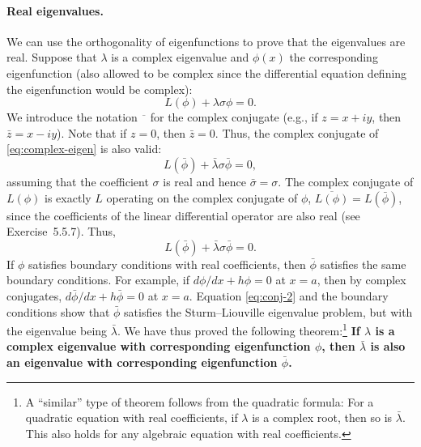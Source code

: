 \paragraph{Real eigenvalues.}
We can use the orthogonality of eigenfunctions to prove that the eigenvalues are real.  Suppose that $\lambda$ is a complex eigenvalue and $\phi(x)$ the corresponding eigenfunction (also allowed to be complex since the differential equation defining the eigenfunction would be complex):
\begin{equation}
\label{eq:complex-eigen}
L(\phi) + \lambda\sigma\phi = 0.
\end{equation}
We introduce the notation $\overline{\phantom{z}}$ for the complex conjugate (e.g., if $z = x + iy$, then $\bar{z} = x - iy$).  Note that if $z = 0$, then $\bar{z} = 0$.  Thus, the complex conjugate of \eqref{eq:complex-eigen} is also valid:
\begin{equation}
\label{eq:conj-1}
L(\bar{\phi}) + \bar{\lambda}\sigma\bar{\phi} = 0,
\end{equation}
assuming that the coefficient $\sigma$ is real and hence $\bar{\sigma} = \sigma$.  The complex conjugate of $L(\phi)$ is exactly $L$ operating on the complex conjugate of $\phi$, $\overline{L(\phi)} = L(\bar{\phi})$, since the coefficients of the linear differential operator are also real (see Exercise~5.5.7).  Thus,
\begin{equation}
\label{eq:conj-2}
L(\bar{\phi}) + \bar{\lambda}\sigma\bar{\phi} = 0.
\end{equation}
If $\phi$ satisfies boundary conditions with real coefficients, then $\bar{\phi}$ satisfies the same boundary conditions.  For example, if $d\phi/dx + h\phi = 0$ at $x = a$, then by complex conjugates, $d\bar{\phi}/dx + h\bar{\phi} = 0$ at $x = a$.  Equation \eqref{eq:conj-2} and the boundary conditions show that $\bar{\phi}$ satisfies the Sturm--Liouville eigenvalue problem, but with the eigenvalue being $\bar{\lambda}$.  We have thus proved the following theorem:\footnote{A ``similar'' type of theorem follows from the quadratic formula: For a quadratic equation with real coefficients, if $\lambda$ is a complex root, then so is $\bar{\lambda}$.  This also holds for any algebraic equation with real coefficients.}  \textbf{If $\lambda$ is a complex eigenvalue with corresponding eigenfunction $\phi$, then $\bar{\lambda}$ is also an eigenvalue with corresponding eigenfunction $\bar{\phi}$.}

